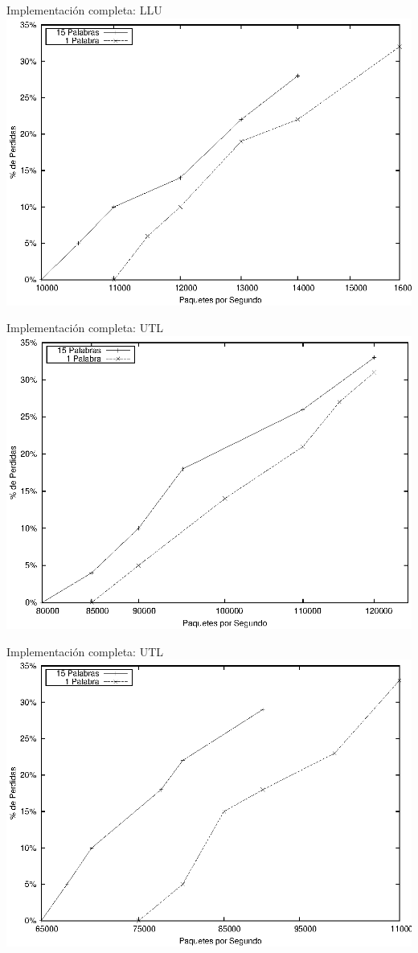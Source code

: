 \documentclass[xcolor=dvipsnames]{beamer}
\begin{document}
\begin{frame}{Implementación completa: LLU} 
\center	
\includegraphics[scale=0.70]{figures/llumax.eps} 
\end{frame}


\begin{frame}{Implementación completa: UTL} 
\center	
\includegraphics[scale=0.70]{figures/utlmin.eps} 
\end{frame}


\begin{frame}{Implementación completa: UTL} 
\center	
\includegraphics[scale=0.70]{figures/utlprom.eps} 
\end{frame}
\end{document}

